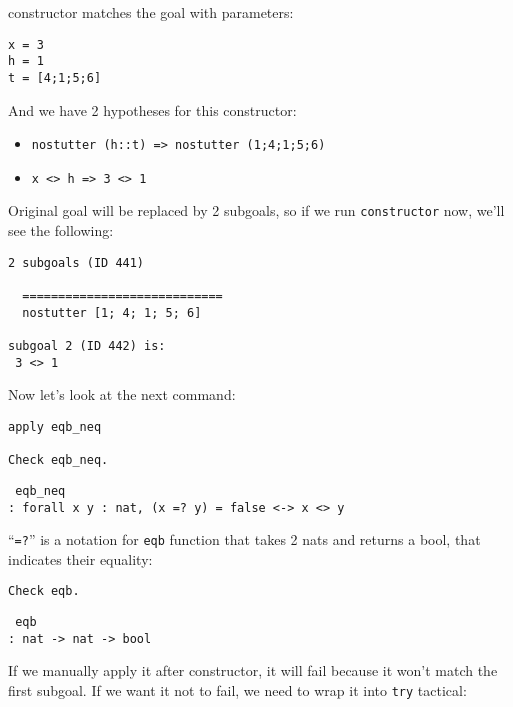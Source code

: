 \documentclass[12pt]{article}
\newcommand{\codeBlock}[1]{\colorbox{cverbbg}{\parbox{0.85\textwidth}{#1}}}
\begin{document}
constructor matches the goal with parameters:

\begin{verbatim}
x = 3
h = 1
t = [4;1;5;6]
\end{verbatim}

And we have 2 hypotheses for this constructor:


\begin{itemize}
\item \texttt{nostutter (h::t) => nostutter (1;4;1;5;6)}
\item \texttt{x <> h => 3 <> 1}
\end{itemize}

Original goal will be replaced by 2 subgoals, so if we run {\tt constructor} now, we'll see the following:

\begin{verbatim}
2 subgoals (ID 441)

  ============================
  nostutter [1; 4; 1; 5; 6]

subgoal 2 (ID 442) is:
 3 <> 1
\end{verbatim}

Now let's look at the next command:

\begin{verbatim}
apply eqb_neq

Check eqb_neq.
\end{verbatim}

\noindent
\begin{minipage}[t]{0.8\textwidth}
\codeBlock{{\tt
eqb\_neq\\
: forall x y : nat, (x =? y) = false <-> x <> y
}}
\end{minipage}

\vspace{2em}
``{\tt =?}'' is a notation for {\tt eqb} function that takes 2 nats and returns a bool, that indicates their equality:

\begin{verbatim}
Check eqb.
\end{verbatim}

\noindent
\begin{minipage}[t]{.45\textwidth}
\codeBlock{{\tt
eqb\\
     : nat -> nat -> bool
}}
\end{minipage}

\vspace{1em}
If we manually apply it after constructor, it will fail because it won't match the first subgoal. If we want it not to fail, we need to wrap it into {\tt try} tactical:
\end{document}
